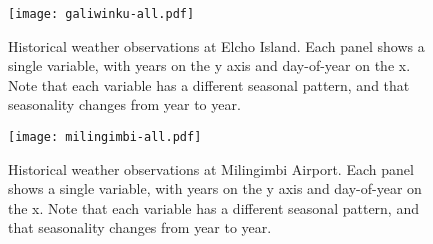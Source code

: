 \begin{figure}[p]
    \centering
    \texttt{[image: galiwinku-all.pdf]}
    \caption[Historical weather observations at Elcho Island]{
        Historical weather observations at Elcho Island.  Each panel shows a single variable, with years on the y axis and day-of-year on the x.
        Note that each variable has a different seasonal pattern, and that seasonality changes from year to year.}
    \label{fig:galiwinku-observations}
\end{figure}
\begin{figure}[p]
    \centering
    \texttt{[image: milingimbi-all.pdf]}
    \caption[Historical weather observations at Milingimbi Airport]{
        Historical weather observations at Milingimbi Airport.  Each panel shows a single variable, with years on the y axis and day-of-year on the x.
        Note that each variable has a different seasonal pattern, and that seasonality changes from year to year.}
    \label{fig:milingimbi-observations}
\end{figure}

\begin{landscape}
\begin{table}

\end{table}
\end{landscape}

